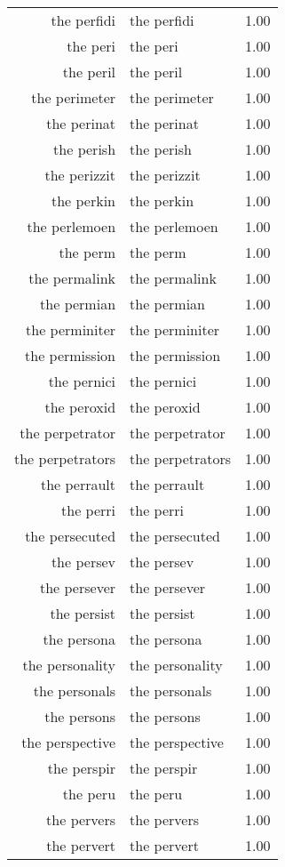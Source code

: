 \begin{table}[ht]
\begin{tabular}{rlr}
  the perfidi & the perfidi & 1.00 \\ 
  the peri & the peri & 1.00 \\ 
  the peril & the peril & 1.00 \\ 
  the perimeter & the perimeter & 1.00 \\ 
  the perinat & the perinat & 1.00 \\ 
  the perish & the perish & 1.00 \\ 
  the perizzit & the perizzit & 1.00 \\ 
  the perkin & the perkin & 1.00 \\ 
  the perlemoen & the perlemoen & 1.00 \\ 
  the perm & the perm & 1.00 \\ 
  the permalink & the permalink & 1.00 \\ 
  the permian & the permian & 1.00 \\ 
  the perminiter & the perminiter & 1.00 \\ 
  the permission & the permission & 1.00 \\ 
  the pernici & the pernici & 1.00 \\ 
  the peroxid & the peroxid & 1.00 \\ 
  the perpetrator & the perpetrator & 1.00 \\ 
  the perpetrators & the perpetrators & 1.00 \\ 
  the perrault & the perrault & 1.00 \\ 
  the perri & the perri & 1.00 \\ 
  the persecuted & the persecuted & 1.00 \\ 
  the persev & the persev & 1.00 \\ 
  the persever & the persever & 1.00 \\ 
  the persist & the persist & 1.00 \\ 
  the persona & the persona & 1.00 \\ 
  the personality & the personality & 1.00 \\ 
  the personals & the personals & 1.00 \\ 
  the persons & the persons & 1.00 \\ 
  the perspective & the perspective & 1.00 \\ 
  the perspir & the perspir & 1.00 \\ 
  the peru & the peru & 1.00 \\ 
  the pervers & the pervers & 1.00 \\ 
  the pervert & the pervert & 1.00 \\ 

\end{tabular}
\end{table}
